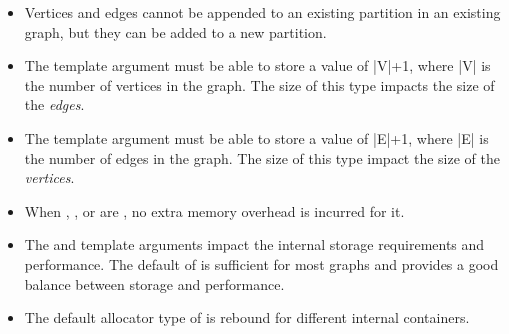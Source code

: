 


\begin{itemdescr}
    \pnum\mandates
        \begin{itemize}
            \item Vertices and edges cannot be appended to an existing partition in an existing graph, but they can be added to a new partition.
        \end{itemize}
    \pnum\preconditions
        \begin{itemize}
            \item The  template argument must be able to store a value of |V|+1, where |V| is the
                  number of vertices in the graph. The size of this type impacts the size of the \textit{edges}.
            \item The  template argument must be able to store a value of |E|+1, where |E| is the
                  number of edges in the graph. The size of this type impact the size of the \textit{vertices}.
        \end{itemize}
    \pnum\effects
        \begin{itemize}
            \item When , , or  are , no extra memory overhead is incurred for it.
            \item The  and  template arguments impact the internal storage requirements and performance.
                  The default of  is sufficient for most graphs and provides a good balance between storage and performance.
        \end{itemize}
    \pnum\remarks 
        \begin{itemize}
            \item The default allocator type of  is rebound for different internal containers.
        \end{itemize}
\end{itemdescr}


